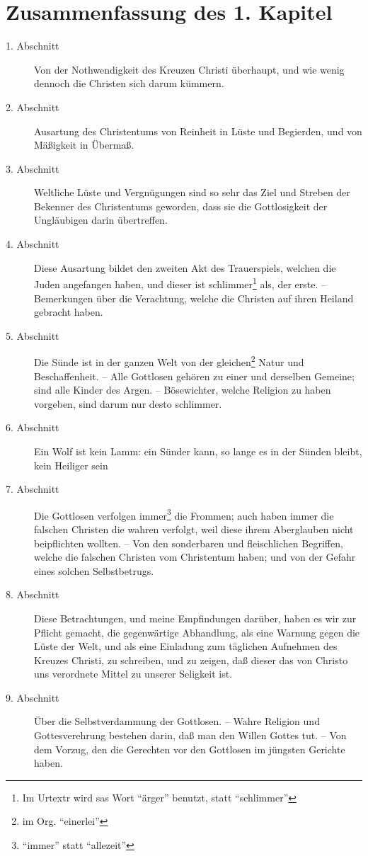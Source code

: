 \section{Zusammenfassung des 1. Kapitel}
\small
\begin{description}
\item[1. Abschnitt] Von der Nothwendigkeit des Kreuzen Christi überhaupt, und wie wenig dennoch die Christen sich darum kümmern.
\item[2. Abschnitt] Ausartung des Christentums von Reinheit in Lüste und Begierden, und von Mäßigkeit in Übermaß.
\item[3. Abschnitt] Weltliche Lüste und Vergnügungen sind so sehr das Ziel und Streben der Bekenner des Christentums geworden, dass sie die Gottlosigkeit der Ungläubigen darin übertreffen.
\item[4. Abschnitt]  Diese Ausartung bildet den zweiten Akt des Trauerspiels, welchen die Juden angefangen haben, und dieser ist schlimmer\footnote{Im Urtextr wird sas Wort "`ärger"' benutzt, statt "`schlimmer"'} als, der erste. -- Bemerkungen über die Verachtung, welche die Christen auf ihren Heiland gebracht haben.
\item[5. Abschnitt] Die Sünde ist in der ganzen Welt von der gleichen\footnote{im Org. "`einerlei"'} Natur und Beschaffenheit. -- Alle Gottlosen gehören zu einer und derselben Gemeine; sind alle Kinder des Argen. -- Bösewichter, welche Religion zu haben vorgeben, sind darum nur desto schlimmer.
\item[6. Abschnitt] Ein Wolf ist kein Lamm: ein Sünder kann, so lange es in der Sünden bleibt, kein Heiliger sein
\item[7. Abschnitt] Die Gottlosen verfolgen immer\footnote{"`immer"' statt "`allezeit"'} die Frommen; auch haben immer die falschen Christen die wahren verfolgt, weil diese ihrem Aberglauben nicht beipflichten wollten. -- Von den sonderbaren und fleischlichen Begriffen, welche die falschen Christen vom Christentum haben; und von der Gefahr eines solchen Selbstbetrugs.
\item[8. Abschnitt] Diese Betrachtungen, und meine Empfindungen darüber, haben es wir zur Pflicht gemacht, die gegenwärtige Abhandlung, als eine Warnung gegen die Lüste der Welt, und als eine Einladung zum täglichen Aufnehmen des Kreuzes Christi, zu schreiben, und zu zeigen, daß dieser das von Christo uns verordnete Mittel zu unserer Seligkeit ist.
\item[9. Abschnitt] Über die Selbstverdammung der Gottlosen. -- Wahre Religion und Gottesverehrung bestehen darin, daß man den Willen Gottes tut. -- Von dem Vorzug, den die Gerechten vor den Gottlosen im jüngsten Gerichte haben.

\end{description}
